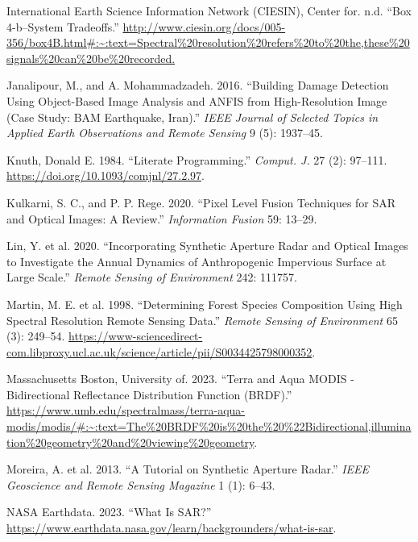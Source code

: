 \documentclass[
  letterpaper,
  DIV=11,
  numbers=noendperiod]{scrreprt}
\newlength{\cslhangindent}
\newenvironment{CSLReferences}[2] %
 {\begin{list}{}{%
  \setlength{\itemindent}{0pt}
  \setlength{\leftmargin}{0pt}
  \setlength{\parsep}{0pt}
  \ifodd #1
   \setlength{\leftmargin}{\cslhangindent}
   \setlength{\itemindent}{-1\cslhangindent}
  \fi
  \setlength{\itemsep}{#2\baselineskip}}}
 {\end{list}}
\begin{document}
\begin{CSLReferences}{1}{0}
International Earth Science Information Network (CIESIN), Center for.
n.d. {``Box 4-b--System Tradeoffs.''}
\url{http://www.ciesin.org/docs/005-356/box4B.html\#:~:text=Spectral\%20resolution\%20refers\%20to\%20the,these\%20signals\%20can\%20be\%20recorded.}

Janalipour, M., and A. Mohammadzadeh. 2016. {``Building Damage Detection
Using Object-Based Image Analysis and ANFIS from High-Resolution Image
(Case Study: BAM Earthquake, Iran).''} \emph{IEEE Journal of Selected
Topics in Applied Earth Observations and Remote Sensing} 9 (5):
1937--45.

Knuth, Donald E. 1984. {``Literate Programming.''} \emph{Comput. J.} 27
(2): 97--111. \url{https://doi.org/10.1093/comjnl/27.2.97}.

Kulkarni, S. C., and P. P. Rege. 2020. {``Pixel Level Fusion Techniques
for SAR and Optical Images: A Review.''} \emph{Information Fusion} 59:
13--29.

Lin, Y. et al. 2020. {``Incorporating Synthetic Aperture Radar and
Optical Images to Investigate the Annual Dynamics of Anthropogenic
Impervious Surface at Large Scale.''} \emph{Remote Sensing of
Environment} 242: 111757.

Martin, M. E. et al. 1998. {``Determining Forest Species Composition
Using High Spectral Resolution Remote Sensing Data.''} \emph{Remote
Sensing of Environment} 65 (3): 249--54.
\url{https://www-sciencedirect-com.libproxy.ucl.ac.uk/science/article/pii/S0034425798000352}.

Massachusetts Boston, University of. 2023. {``Terra and Aqua MODIS -
Bidirectional Reflectance Distribution Function (BRDF).''}
\url{https://www.umb.edu/spectralmass/terra-aqua-modis/modis/\#:~:text=The\%20BRDF\%20is\%20the\%20\%22Bidirectional,illumination\%20geometry\%20and\%20viewing\%20geometry}.

Moreira, A. et al. 2013. {``A Tutorial on Synthetic Aperture Radar.''}
\emph{IEEE Geoscience and Remote Sensing Magazine} 1 (1): 6--43.

NASA Earthdata. 2023. {``What Is SAR?''}
\url{https://www.earthdata.nasa.gov/learn/backgrounders/what-is-sar}.


\end{CSLReferences}
\end{document}
